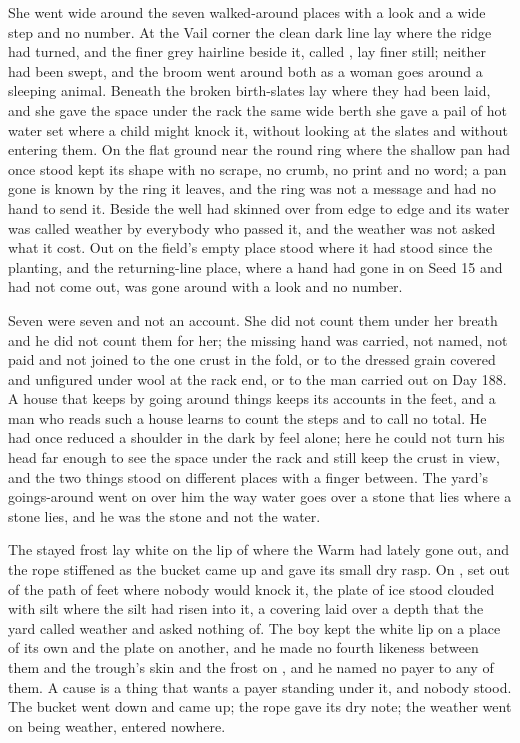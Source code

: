 She went wide around the seven walked-around places with a look and a wide step and no number. At the Vail corner the clean dark line lay where the  ridge had turned, and the finer grey hairline beside it, called , lay finer still; neither had been swept, and the broom went around both as a woman goes around a sleeping animal. Beneath  the broken birth-slates lay where they had been laid, and she gave the space under the rack the same wide berth she gave a pail of hot water set where a child might knock it, without looking at the slates and without entering them. On the flat ground near  the round ring where the shallow pan had once stood kept its shape with no scrape, no crumb, no print and no word; a pan gone is known by the ring it leaves, and the ring was not a message and had no hand to send it. Beside the well  had skinned over from edge to edge and its water was called weather by everybody who passed it, and the weather was not asked what it cost. Out on  the field's empty place stood where it had stood since the planting, and the returning-line place, where a hand had gone in on Seed 15 and had not come out, was gone around with a look and no number.

Seven were seven and not an account. She did not count them under her breath and he did not count them for her; the missing hand was carried, not named, not paid and not joined to the one crust in the fold, or to the dressed grain covered and unfigured under wool at the rack end, or to the man carried out on Day 188. A house that keeps by going around things keeps its accounts in the feet, and a man who reads such a house learns to count the steps and to call no total. He had once reduced a shoulder in the dark by feel alone; here he could not turn his head far enough to see the space under the rack and still keep the crust in view, and the two things stood on different places with a finger between. The yard's goings-around went on over him the way water goes over a stone that lies where a stone lies, and he was the stone and not the water.

The stayed frost lay white on the lip of  where the Warm had lately gone out, and the rope stiffened as the bucket came up and gave its small dry rasp. On , set out of the path of feet where nobody would knock it, the plate of ice stood clouded with silt where the silt had risen into it, a covering laid over a depth that the yard called weather and asked nothing of. The boy kept the white lip on a place of its own and the plate on another, and he made no fourth likeness between them and the trough's skin and the frost on , and he named no payer to any of them. A cause is a thing that wants a payer standing under it, and nobody stood. The bucket went down and came up; the rope gave its dry note; the weather went on being weather, entered nowhere.

